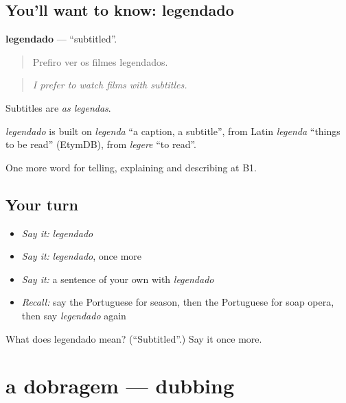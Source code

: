 \subsection*{You'll want to know: legendado}
\textbf{legendado} — \textquotedblleft{}subtitled\textquotedblright{}.

\begin{quote}
Prefiro ver os filmes legendados.
\end{quote}

\begin{quote}
\emph{I prefer to watch films with subtitles.}
\end{quote}

Subtitles are \emph{as legendas}.

\begin{cousinweb}
\emph{legendado} is built on \emph{legenda} \textquotedblleft{}a caption, a subtitle\textquotedblright{}, from Latin \emph{legenda} \textquotedblleft{}things to be read\textquotedblright{} (EtymDB), from \emph{legere} \textquotedblleft{}to read\textquotedblright{}.
\end{cousinweb}

\begin{grammarlens}[title={What you've built}]
One more word for telling, explaining and describing at B1.
\end{grammarlens}

\subsection*{Your turn}
\begin{itemize}
\raggedright
  \item \emph{Say it:} \emph{legendado}
  \item \emph{Say it:} \emph{legendado}, once more
  \item \emph{Say it:} a sentence of your own with \emph{legendado}
  \item \emph{Recall:} say the Portuguese for season, then the Portuguese for soap opera, then say \emph{legendado} again
\end{itemize}

\begin{tcolorbox}[breakable,colback=teal!4,colframe=teal!35!black,title={Before you move on}]
What does legendado mean? (\textquotedblleft{}Subtitled\textquotedblright{}.) Say it once more.
\end{tcolorbox}
\section[a dobragem]{a dobragem — dubbing}

